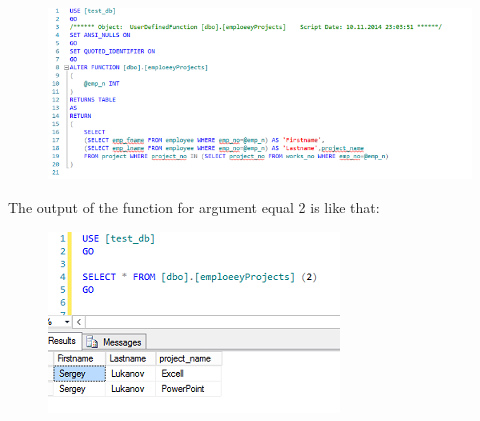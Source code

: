 \documentclass[english]{article}
\begin{document}
\begin{figure}[H]
\centerline{\includegraphics[scale=0.8]{FunctionsSQLServer/firstSource}}
\end{figure}
The output of the function for argument equal 2 is like that:
\begin{figure}[H]
\centerline{\includegraphics[scale=0.8]{FunctionsSQLServer/firstOutputFor2}}
\end{figure}
\end{document}
